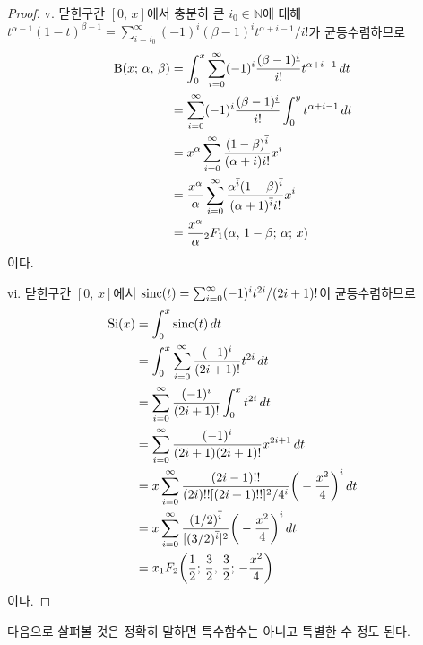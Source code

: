 \begin{proof}
    v. 닫힌구간 $[0,\,x]$에서 충분히 큰 $i_0\in\mathbb{N}$에 대해 $t^{\alpha-1}(1-t)^{\beta-1}=\sum_{i=i_0}^\infty(-1)^i(\beta-1)^{\underline{i}}t^{\alpha+i-1}/i!$가 균등수렴하므로
    \begin{align*}
        \mathrm{B}(x;\,\alpha,\,\beta)&=\int_0^x\sum_{i=0}^\infty(-1)^i\frac{(\beta-1)^{\underline{i}}}{i!}t^{\alpha+i-1}\,dt\\
        &=\sum_{i=0}^\infty(-1)^i\frac{(\beta-1)^{\underline{i}}}{i!}\int_0^yt^{\alpha+i-1}\,dt\\
        &=x^\alpha\sum_{i=0}^\infty\frac{(1-\beta)^{\overline{i}}}{(\alpha+i)i!}x^i\\
        &=\frac{x^\alpha}{\alpha}\sum_{i=0}^\infty\frac{\alpha^{\overline{i}}(1-\beta)^{\overline{i}}}{(\alpha+1)^{\overline{i}}i!}x^i\\
        &=\frac{x^\alpha}{\alpha}{}_2F_1(\alpha,\,1-\beta;\,\alpha;\,x)
    \end{align*}
    이다.

    vi. 닫힌구간 $[0,\,x]$에서 $\mathrm{sinc}(t)=\sum_{i=0}^\infty(-1)^it^{2i}/(2i+1)!$이 균등수렴하므로
    \begin{align*}
        \mathrm{Si}(x)&=\int_0^x\mathrm{sinc}(t)\,dt\\
        &=\int_0^x\sum_{i=0}^\infty\frac{(-1)^i}{(2i+1)!}t^{2i}\,dt\\
        &=\sum_{i=0}^\infty\frac{(-1)^i}{(2i+1)!}\int_0^xt^{2i}\,dt\\
        &=\sum_{i=0}^\infty\frac{(-1)^i}{(2i+1)(2i+1)!}x^{2i+1}\,dt\\
        &=x\sum_{i=0}^\infty\frac{(2i-1)!!}{(2i)!![(2i+1)!!]^2/4^i}\bigg(-\frac{x^2}{4}\bigg)^i\,dt\\
        &=x\sum_{i=0}^\infty\frac{(1/2)^{\overline{i}}}{[(3/2)^{\overline{i}}]^2}\bigg(-\frac{x^2}{4}\bigg)^i\,dt\\
        &=x_1F_2\bigg(\frac{1}{2};\,\frac{3}{2},\,\frac{3}{2};\,-\frac{x^2}{4}\bigg)
    \end{align*}
    이다.
\end{proof}

다음으로 살펴볼 것은 정확히 말하면 특수함수는 아니고 특별한 수 정도 된다.


